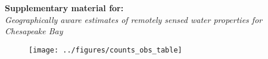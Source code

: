 \documentclass[12pt]{article}
\begin{document}
\begin{center}
\textbf{Supplementary material for:}\\
\emph{Geographically aware estimates of remotely sensed water properties for Chesapeake Bay}
\end{center}

\begin{figure}[h!]
    \begin{center}
          \texttt{[image: ../figures/counts\_obs\_table]}
    \end{center}    
\end{figure}

\clearpage
\end{document}
